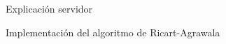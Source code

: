 \documentclass[12pt,titlepage]{article}
\begin{document}
\begin{section}{Explicación servidor}
\begin{subsection}{Implementación del algoritmo de Ricart-Agrawala}
	\end{subsection}

%			
\end{section}
\end{document}
